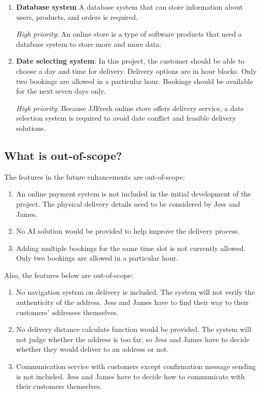 \documentclass{report}
\begin{document}
\begin{enumerate}
  \item \textbf{Database system} A database system that can store information about users, products, and orders is required.
  
  \textit{High priority}: An online store is a type of software products that need a database system to store more and more data.
  
  \item \textbf{Date selecting system}: In this project, the customer should be able to choose a day and time for delivery. Delivery options are in hour blocks. Only two bookings are allowed in a particular hour. Bookings should be available for the next seven days only.
  
  \textit{High priority}: Because JJFresh online store offers delivery service, a date selection system is required to avoid date conflict and  feasible delivery solutions.
\end{enumerate}
\subsection{What is out-of-scope?}
The features in the future enhancements are out-of-scope:
\begin{enumerate}
  \item An online payment system is not included in the initial development of the project. The physical delivery details need to be considered by Jess and James. 
  \item No AI solution would be provided to help improve the delivery process. 
  \item Adding multiple bookings for the same time slot is not currently allowed. Only two bookings are allowed in a particular hour.
\end{enumerate}

Also, the features below are out-of-scope:
\begin{enumerate}
  \item No navigation system on delivery is included. The system will not verify the authenticity of the address. Jess and James have to find their way to their customers' addresses themselves.
  \item No delivery distance calculate function would be provided. The system will not judge whether the address is too far, so Jess and James have to decide whether they would deliver to an address or not. 
  \item Communication service with customers except confirmation message sending is not included. Jess and James have to decide how to communicate with their customers themselves.
\end{enumerate}
\end{document}
